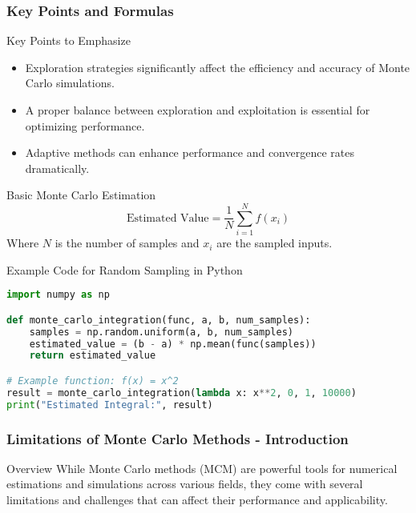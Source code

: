 \documentclass[aspectratio=169]{beamer}
\begin{document}
\begin{frame}[fragile]
    \frametitle{Key Points and Formulas}
    \begin{block}{Key Points to Emphasize}
        \begin{itemize}
            \item Exploration strategies significantly affect the efficiency and accuracy of Monte Carlo simulations.
            \item A proper balance between exploration and exploitation is essential for optimizing performance.
            \item Adaptive methods can enhance performance and convergence rates dramatically.
        \end{itemize}
    \end{block}

    \begin{block}{Basic Monte Carlo Estimation}
        \begin{equation}
            \text{Estimated Value} = \frac{1}{N} \sum_{i=1}^N f(x_i)
        \end{equation}
        Where \( N \) is the number of samples and \( x_i \) are the sampled inputs.
    \end{block}

    \begin{block}{Example Code for Random Sampling in Python}
        \begin{lstlisting}[language=Python]
import numpy as np

def monte_carlo_integration(func, a, b, num_samples):
    samples = np.random.uniform(a, b, num_samples)
    estimated_value = (b - a) * np.mean(func(samples))
    return estimated_value

# Example function: f(x) = x^2
result = monte_carlo_integration(lambda x: x**2, 0, 1, 10000)
print("Estimated Integral:", result)
        \end{lstlisting}
    \end{block}
\end{frame}

\begin{frame}[fragile]
  \frametitle{Limitations of Monte Carlo Methods - Introduction}
  \begin{block}{Overview}
    While Monte Carlo methods (MCM) are powerful tools for numerical estimations and simulations across various fields, 
    they come with several limitations and challenges that can affect their performance and applicability.
  \end{block}
\end{frame}
\end{document}
